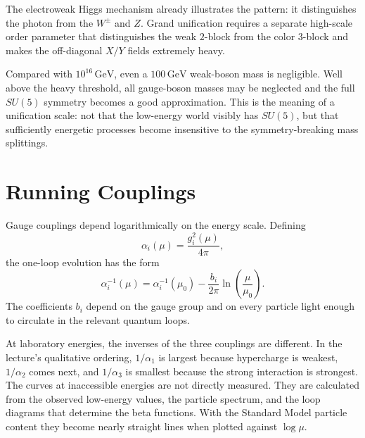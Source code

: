 \begin{classroomqa}
\end{classroomqa}

The electroweak Higgs mechanism already illustrates the pattern: it distinguishes the photon from the \(W^\pm\) and \(Z\). Grand unification requires a separate high-scale order parameter that distinguishes the weak \(2\)-block from the color \(3\)-block and makes the off-diagonal \(X/Y\) fields extremely heavy.

Compared with \(10^{16}\,\mathrm{GeV}\), even a \(100\,\mathrm{GeV}\) weak-boson mass is negligible. Well above the heavy threshold, all gauge-boson masses may be neglected and the full \(SU(5)\) symmetry becomes a good approximation. This is the meaning of a unification scale: not that the low-energy world visibly has \(SU(5)\), but that sufficiently energetic processes become insensitive to the symmetry-breaking mass splittings.

\section{Running Couplings}

Gauge couplings depend logarithmically on the energy scale. Defining
\begin{equation}
\alpha_i(\mu)=\frac{g_i^2(\mu)}{4\pi},
\end{equation}
the one-loop evolution has the form
\begin{equation}
\alpha_i^{-1}(\mu)
=
\alpha_i^{-1}(\mu_0)
-\frac{b_i}{2\pi}
\ln\!\left(\frac{\mu}{\mu_0}\right).
\label{eq:l10-running}
\end{equation}
The coefficients \(b_i\) depend on the gauge group and on every particle light enough to circulate in the relevant quantum loops.


At laboratory energies, the inverses of the three couplings are different. In the lecture's qualitative ordering, \(1/\alpha_1\) is largest because hypercharge is weakest, \(1/\alpha_2\) comes next, and \(1/\alpha_3\) is smallest because the strong interaction is strongest. The curves at inaccessible energies are not directly measured. They are calculated from the observed low-energy values, the particle spectrum, and the loop diagrams that determine the beta functions. With the Standard Model particle content they become nearly straight lines when plotted against \(\log\mu\).

